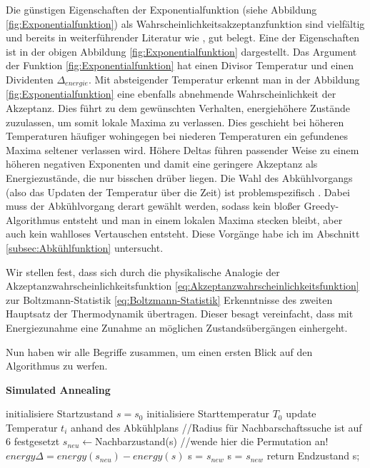 Die günstigen Eigenschaften der Exponentialfunktion (siehe Abbildung \ref{fig:Exponentialfunktion}) als Wahrscheinlichkeitsakzeptanzfunktion sind vielfältig und bereits in weiterführender Literatur wie 
\cite{Kirkpatrick671},\cite{van1987simulated} gut belegt. Eine der Eigenschaften ist in der obigen Abbildung \ref{fig:Exponentialfunktion} dargestellt. Das Argument der Funktion 
\ref{fig:Exponentialfunktion} hat einen Divisor Temperatur und einen Dividenten $\Delta_{energie}$. Mit absteigender Temperatur erkennt man 
in der Abbildung \ref{fig:Exponentialfunktion} eine ebenfalls abnehmende Wahrscheinlichkeit der Akzeptanz. Dies führt zu dem gewünschten Verhalten, energiehöhere Zustände 
zuzulassen, um somit lokale Maxima zu verlassen. Dies geschieht bei höheren Temperaturen häufiger wohingegen bei niederen Temperaturen ein gefundenes Maxima
seltener verlassen wird. Höhere Deltas führen passender Weise zu einem höheren negativen Exponenten und damit eine geringere Akzeptanz als Energiezustände, die nur bisschen 
drüber liegen. Die Wahl des Abkühlvorgangs (also das Updaten der Temperatur über die Zeit) ist problemspezifisch \cite[S. 9]{Kirkpatrick671}. Dabei muss der Abkühlvorgang derart
gewählt werden, sodass kein bloßer Greedy-Algorithmus entsteht und man in einem lokalen Maxima stecken bleibt, aber auch kein wahlloses Vertauschen entsteht.
Diese Vorgänge habe ich im Abschnitt \ref{subsec:Abkühlfunktion} untersucht.\par
Wir stellen fest, dass sich durch die physikalische Analogie der Akzeptanzwahrscheinlichkeitsfunktion \ref{eq:Akzeptanzwahrscheinlichkeitsfunktion} zur 
Boltzmann-Statistik \ref{eq:Boltzmann-Statistik} Erkenntnisse des zweiten Hauptsatz der Thermodynamik übertragen. Dieser besagt vereinfacht, 
dass mit Energiezunahme eine Zunahme an möglichen Zustandsübergängen einhergeht.

Nun haben wir alle Begriffe zusammen, um einen ersten Blick auf den Algorithmus zu werfen.
\begin{tcolorbox}
\begin{algorithm}[H]
    \caption{\textbf{Simulated Annealing}}
    \begin{algorithmic}[1]
        \State initialisiere Startzustand $s=s_{0}$
        \State initialisiere Starttemperatur $T_0$
        \State update Temperatur $t_i$ anhand des Abkühlplans
        \State //Radius für Nachbarschaftssuche ist auf 6 festgesetzt
        \State $s_{neu}\leftarrow$Nachbarzustand(s) //wende hier die Permutation an!
        \State $energy\Delta = energy(s_{neu}) - energy(s)$
        \State s = $s_{new}$
        \Else{}
        \State s = $s_{new}$
        \EndIf
        \EndIf
        \EndFor
        \State return Endzustand s;
    \end{algorithmic}
    \label{alg:retargeting}
\end{algorithm}
\end{tcolorbox}


